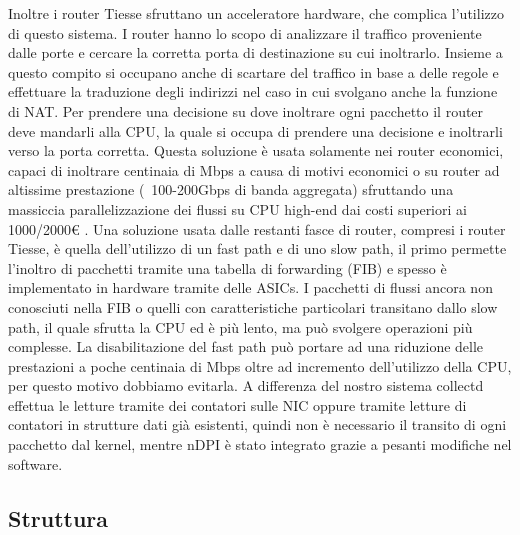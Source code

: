 Inoltre i router Tiesse sfruttano un acceleratore hardware, che complica l'utilizzo di questo sistema. I router hanno lo scopo di analizzare il traffico proveniente dalle porte e cercare la corretta porta di destinazione su cui inoltrarlo. Insieme a questo compito si occupano anche di scartare del traffico in base a delle regole e effettuare la traduzione degli indirizzi nel caso in cui svolgano anche la funzione di NAT. Per prendere una decisione su dove inoltrare ogni pacchetto il router deve mandarli alla CPU, la quale si occupa di prendere una decisione e inoltrarli verso la porta corretta. Questa soluzione è usata solamente nei router economici, capaci di inoltrare centinaia di Mbps a causa di motivi economici o su router ad altissime prestazione (~100-200Gbps di banda aggregata) sfruttando una massiccia parallelizzazione dei flussi su CPU high-end dai costi superiori ai 1000/2000€ \cite{risso_sn}. Una soluzione usata dalle restanti fasce di router, compresi i router Tiesse, è quella dell'utilizzo di un fast path e di uno slow path, il primo permette l'inoltro di pacchetti tramite una tabella di forwarding (FIB) e spesso è implementato in hardware tramite delle ASICs. I pacchetti di flussi ancora non conosciuti nella FIB o quelli con caratteristiche particolari transitano dallo slow path, il quale sfrutta la CPU ed è più lento, ma può svolgere operazioni più complesse. La disabilitazione del fast path può portare ad una riduzione delle prestazioni a poche centinaia di Mbps oltre ad incremento dell'utilizzo della CPU, per questo motivo dobbiamo evitarla. 
A differenza del nostro sistema collectd effettua le letture tramite dei contatori sulle NIC oppure tramite letture di contatori in strutture dati già esistenti, quindi non è necessario il transito di ogni pacchetto dal kernel, mentre nDPI è stato integrato grazie a pesanti modifiche nel software.





\subsection{Struttura}


